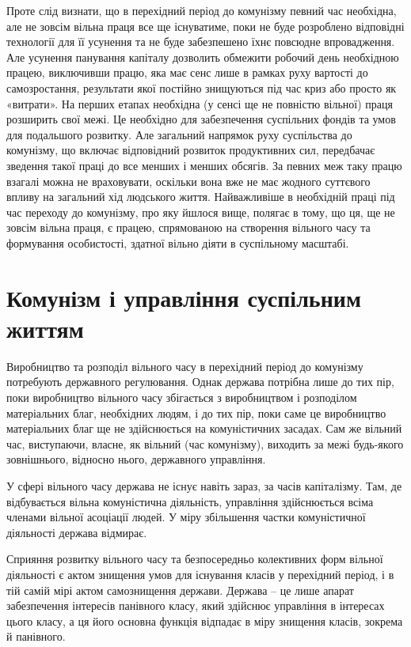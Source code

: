 \documentclass[12pt,a4paper,openany]{book}
\begin{document}
Проте слід визнати, що в перехідний період до комунізму певний час необхідна, але не зовсім вільна праця все ще існуватиме, поки не буде розроблено відповідні технології для її усунення та не буде забезпешено їхнє повсюдне впровадження. Але усунення панування капіталу дозволить обмежити робочий день необхідною працею, виключивши працю, яка має сенс лише в рамках руху вартості до самозростання, результати якої постійно знищуються під час криз або просто як «витрати». На перших етапах необхідна (у сенсі ще не повністю вільної) праця розширить свої межі. Це необхідно для забезпечення суспільних фондів та умов для подальшого розвитку. Але загальний напрямок руху суспільства до комунізму, що включає відповідний розвиток продуктивних сил, передбачає зведення такої праці до все менших і менших обсягів. За певних меж таку працю взагалі можна не враховувати, оскільки вона вже не має жодного суттєвого впливу на загальний хід людського життя. Найважливіше в необхідній праці під час переходу до комунізму, про яку йшлося вище, полягає в тому, що ця, ще не зовсім вільна праця, є працею, спрямованою на створення вільного часу та формування особистості, здатної вільно діяти в суспільному масштабі.
\ifSubfilesClassLoaded{\setcounter{page}{40}}{}
\section{Комунізм і управління суспільним життям}
\label{sec:07_kommunizm_upravlenie}

Виробництво та розподіл вільного часу в перехідний період до комунізму потребують державного регулювання. Однак держава потрібна лише до тих пір, поки виробництво вільного часу збігається з виробництвом і розподілом матеріальних благ, необхідних людям, і до тих пір, поки саме це виробництво матеріальних благ ще не здійснюється на комуністичних засадах. Сам же вільний час, виступаючи, власне, як вільний (час комунізму), виходить за межі будь-якого зовнішнього, відносно нього, державного управління.

У сфері вільного часу держава не існує навіть зараз, за часів капіталізму. Там, де відбувається вільна комуністична діяльність, управління здійснюється всіма членами вільної асоціації людей. У міру збільшення частки комуністичної діяльності держава відмирає.

Сприяння розвитку вільного часу та безпосередньо колективних форм вільної діяльності є актом знищення умов для існування класів у перехідний період, і в тій самій мірі актом самознищення держави. Держава – це лише апарат забезпечення інтересів панівного класу, який здійснює управління в інтересах цього класу, а ця його основна функція відпадає в міру знищення класів, зокрема й панівного.
\end{document}
